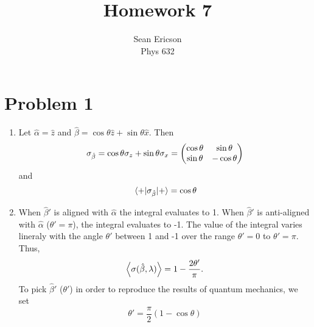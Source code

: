 \documentclass[12pt]{article}
\begin{document}
	
\title{Homework 7}
\author{Sean Ericson \\ Phys 632}
\maketitle

\section*{Problem 1}
\begin{enumerate}[label=(\alph*)]
    \item Let $\hat{\alpha} = \hat{z}$ and $\hat{\beta} = \cos\theta\hat{z} + \sin\theta\hat{x}$. Then
    \[ \sigma_{\hat{\beta}} = \cos \theta\sigma_z + \sin \theta\sigma_x = \mqty(\cos\theta & \sin\theta \\ \sin\theta & -\cos\theta) \]
    and
    \[ \mel{+}{\sigma_{\hat{\beta}}}{+} = \cos\theta \]

    \item When $\hat{\beta}'$ is aligned with $\hat{\alpha}$ the integral evaluates to 1. When $\hat{\beta}'$ is anti-aligned with $\hat{\alpha}$ ($\theta' = \pi$), the integral evaluates to -1. The value of the integral varies lineraly with the angle $\theta'$ between 1 and -1 over the range $\theta'=0$ to $\theta'=\pi$. Thus,
    \[ \ev{\sigma(\hat{\beta},\lambda)} = 1 - \frac{2\theta'}{\pi}. \]
    To pick $\hat{\beta}'$ ($\theta'$) in order to reproduce the results of quantum mechanics, we set
    \[ \theta' = \frac{\pi}{2}(1-\cos\theta) \]
\end{enumerate}
\end{document}
